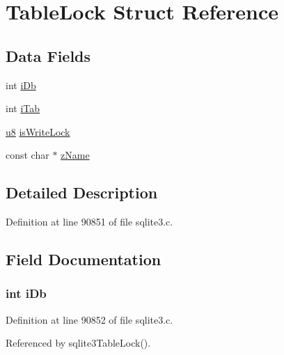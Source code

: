 \hypertarget{struct_table_lock}{}\section{Table\+Lock Struct Reference}
\label{struct_table_lock}
\subsection*{Data Fields}
\begin{DoxyCompactItemize}
\item 
int \hyperlink{struct_table_lock_ad5da55f1bf334f91b2f63a6a63be348b}{i\+Db}
\item 
int \hyperlink{struct_table_lock_a760c7fcee56dbbf2730283e37700c480}{i\+Tab}
\item 
\hyperlink{sqlite3_8c_a74a0f6424ae628af25f23f0a35f6ead3}{u8} \hyperlink{struct_table_lock_aa2a01dd5afb009f09248dc65d2ea4587}{is\+Write\+Lock}
\item 
const char $\ast$ \hyperlink{struct_table_lock_ab014fc02d99cc45050cdfcda485c780a}{z\+Name}
\end{DoxyCompactItemize}


\subsection{Detailed Description}


Definition at line 90851 of file sqlite3.\+c.



\subsection{Field Documentation}
\hypertarget{struct_table_lock_ad5da55f1bf334f91b2f63a6a63be348b}{}
\subsubsection[{i\+Db}]{\setlength{\rightskip}{0pt plus 5cm}int i\+Db}\label{struct_table_lock_ad5da55f1bf334f91b2f63a6a63be348b}


Definition at line 90852 of file sqlite3.\+c.



Referenced by sqlite3\+Table\+Lock().

\hypertarget{struct_table_lock_aa2a01dd5afb009f09248dc65d2ea4587}{}
